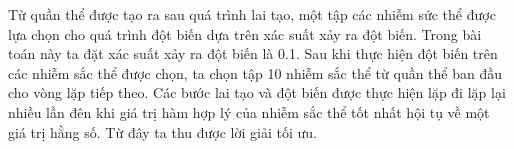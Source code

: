 \documentclass[14pt, a4paper]{article}
\numberwithin{equation}{section}
\numberwithin{figure}{section}
\numberwithin{dl}{section}
\numberwithin{md}{section}
\numberwithin{bd}{section}
\numberwithin{dn}{section}
\numberwithin{hq}{section}
\begin{document}
    Từ quần thể được tạo ra sau quá trình lai tạo, một tập các nhiễm sức thể được lựa chọn cho quá trình đột biến dựa trên xác suất xảy ra đột biến.
    Trong bài toán này ta đặt xác suất xảy ra đột biến là 0.1.
    Sau khi thực hiện đột biến trên các nhiễm sắc thể được chọn, ta chọn tập 10 nhiễm sắc thể từ quần thể ban đầu cho vòng lặp tiếp theo.
    Các bước lai tạo và đột biến được thực hiện lặp đi lặp lại nhiều lần đên khi giá trị hàm hợp lý của nhiễm sắc thể tốt nhất hội tụ về một giá trị hằng số. 
    Từ đây ta thu được lời giải tối ưu.

    \newpage
    \printbibliography[title={TÀI LIỆU THAM KHẢO}]
\end{document}
